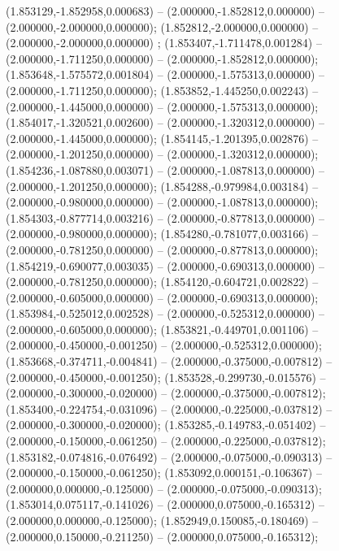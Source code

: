  (1.853129,-1.852958,0.000683) -- (2.000000,-1.852812,0.000000) -- (2.000000,-2.000000,0.000000);
 (1.852812,-2.000000,0.000000) -- (2.000000,-2.000000,0.000000) ;
 (1.853407,-1.711478,0.001284) -- (2.000000,-1.711250,0.000000) -- (2.000000,-1.852812,0.000000);
 (1.853648,-1.575572,0.001804) -- (2.000000,-1.575313,0.000000) -- (2.000000,-1.711250,0.000000);
 (1.853852,-1.445250,0.002243) -- (2.000000,-1.445000,0.000000) -- (2.000000,-1.575313,0.000000);
 (1.854017,-1.320521,0.002600) -- (2.000000,-1.320312,0.000000) -- (2.000000,-1.445000,0.000000);
 (1.854145,-1.201395,0.002876) -- (2.000000,-1.201250,0.000000) -- (2.000000,-1.320312,0.000000);
 (1.854236,-1.087880,0.003071) -- (2.000000,-1.087813,0.000000) -- (2.000000,-1.201250,0.000000);
 (1.854288,-0.979984,0.003184) -- (2.000000,-0.980000,0.000000) -- (2.000000,-1.087813,0.000000);
 (1.854303,-0.877714,0.003216) -- (2.000000,-0.877813,0.000000) -- (2.000000,-0.980000,0.000000);
 (1.854280,-0.781077,0.003166) -- (2.000000,-0.781250,0.000000) -- (2.000000,-0.877813,0.000000);
 (1.854219,-0.690077,0.003035) -- (2.000000,-0.690313,0.000000) -- (2.000000,-0.781250,0.000000);
 (1.854120,-0.604721,0.002822) -- (2.000000,-0.605000,0.000000) -- (2.000000,-0.690313,0.000000);
 (1.853984,-0.525012,0.002528) -- (2.000000,-0.525312,0.000000) -- (2.000000,-0.605000,0.000000);
 (1.853821,-0.449701,0.001106) -- (2.000000,-0.450000,-0.001250) -- (2.000000,-0.525312,0.000000);
 (1.853668,-0.374711,-0.004841) -- (2.000000,-0.375000,-0.007812) -- (2.000000,-0.450000,-0.001250);
 (1.853528,-0.299730,-0.015576) -- (2.000000,-0.300000,-0.020000) -- (2.000000,-0.375000,-0.007812);
 (1.853400,-0.224754,-0.031096) -- (2.000000,-0.225000,-0.037812) -- (2.000000,-0.300000,-0.020000);
 (1.853285,-0.149783,-0.051402) -- (2.000000,-0.150000,-0.061250) -- (2.000000,-0.225000,-0.037812);
 (1.853182,-0.074816,-0.076492) -- (2.000000,-0.075000,-0.090313) -- (2.000000,-0.150000,-0.061250);
 (1.853092,0.000151,-0.106367) -- (2.000000,0.000000,-0.125000) -- (2.000000,-0.075000,-0.090313);
 (1.853014,0.075117,-0.141026) -- (2.000000,0.075000,-0.165312) -- (2.000000,0.000000,-0.125000);
 (1.852949,0.150085,-0.180469) -- (2.000000,0.150000,-0.211250) -- (2.000000,0.075000,-0.165312);
